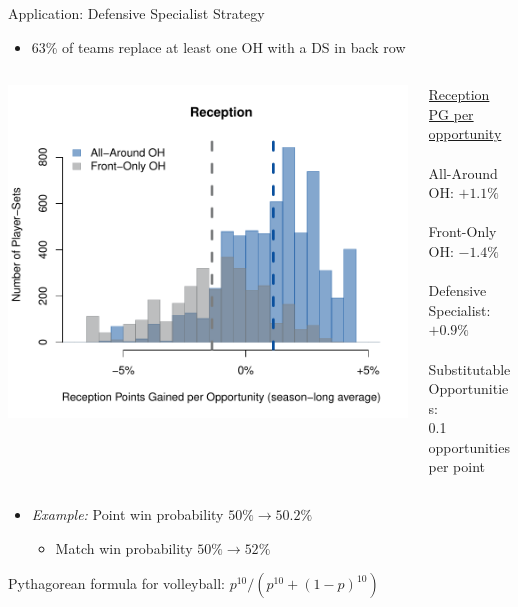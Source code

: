 \documentclass[handout]{beamer}
\begin{document}
\begin{frame}{Application: Defensive Specialist Strategy}
  \begin{itemize}
    \item 63\% of teams replace at least one OH with a DS in back row
  \end{itemize}
  \vspace{2mm}
  \begin{columns}
    \begin{column}{0.5\textwidth}
      \centering
      \includegraphics[width = \textwidth]{images/oh_comparison.pdf}
    \end{column}
    \begin{column}{0.5\textwidth}
      \small
      \underline{Reception PG per opportunity}\\
      ~\\
      \color{ricerichblue} All-Around OH: $+1.1\%$\\
      ~\\
      \color{ricegray} Front-Only OH: $-1.4\%$\\
      ~\\
      \color{white} Defensive Specialist: $+0.9\%$\\
      ~\\
      \color{white} Substitutable Opportunities:\\
      0.1 opportunities per point
    \end{column}
  \end{columns}
  \vspace{4mm}
  \begin{itemize}
    \color{white}
    \item[\color{white}] {\it Example:} Point win probability $50\% \rightarrow 50.2\%$
    \begin{itemize}
      \color{white}
      \item[\color{white}] Match win probability $50\% \rightarrow 52\%$
    \end{itemize}
  \end{itemize}
  \vspace{3mm}
  \centering
  \footnotesize
  \color{white}
  Pythagorean formula for volleyball: $p^{10} / (p^{10} + (1-p)^{10})$
\end{frame}
\end{document}
